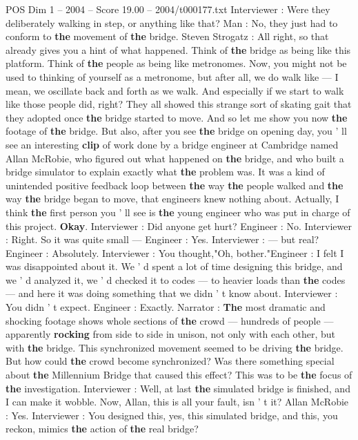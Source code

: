 \begin{textsample}{POS Dim 1 – 2004 – Score 19.00 – 2004/t000177.txt}
Interviewer : Were they deliberately walking in step, or anything like that?
Man : No, they just had to conform to \textbf{the} movement of \textbf{the} bridge.
Steven Strogatz : All right, so that already gives you a hint of what happened.
Think of \textbf{the} bridge as being like this platform.
Think of \textbf{the} people as being like metronomes.
Now, you might not be used to thinking of yourself as a metronome, but after all, we do walk like — I mean, we oscillate back and forth as we walk.
And especially if we start to walk like those people did, right?
They all showed this strange sort of skating gait that they adopted once \textbf{the} bridge started to move.
And so let me show you now \textbf{the} footage of \textbf{the} bridge.
But also, after you see \textbf{the} bridge on opening day, you ' ll see an interesting \textbf{clip} of work done by a bridge engineer at Cambridge named Allan McRobie, who figured out what happened on \textbf{the} bridge, and who built a bridge simulator to explain exactly what \textbf{the} problem was.
It was a kind of unintended positive feedback loop between \textbf{the} way \textbf{the} people walked and \textbf{the} way \textbf{the} bridge began to move, that engineers knew nothing about.
Actually, I think \textbf{the} first person you ' ll see is \textbf{the} young engineer who was put in charge of this project. \textbf{Okay}.
Interviewer : Did anyone get hurt?
Engineer : No.
Interviewer : Right.
So it was quite small — Engineer : Yes.
Interviewer : — but real?
Engineer : Absolutely.
Interviewer : You thought,"Oh, bother."Engineer : I felt I was disappointed about it.
We ' d spent a lot of time designing this bridge, and we ' d analyzed it, we ' d checked it to codes — to heavier loads than \textbf{the} codes — and here it was doing something that we didn ' t know about.
Interviewer : You didn ' t expect.
Engineer : Exactly.
Narrator : \textbf{The} most dramatic and shocking footage shows whole sections of \textbf{the} crowd — hundreds of people — apparently \textbf{rocking} from side to side in unison, not only with each other, but with \textbf{the} bridge.
This synchronized movement seemed to be driving \textbf{the} bridge.
But how could \textbf{the} crowd become synchronized?
Was there something special about \textbf{the} Millennium Bridge that caused this effect?
This was to be \textbf{the} focus of \textbf{the} investigation.
Interviewer : Well, at last \textbf{the} simulated bridge is finished, and I can make it wobble.
Now, Allan, this is all your fault, isn ' t it?
Allan McRobie : Yes.
Interviewer : You designed this, yes, this simulated bridge, and this, you reckon, mimics \textbf{the} action of \textbf{the} real bridge?

\end{textsample}
